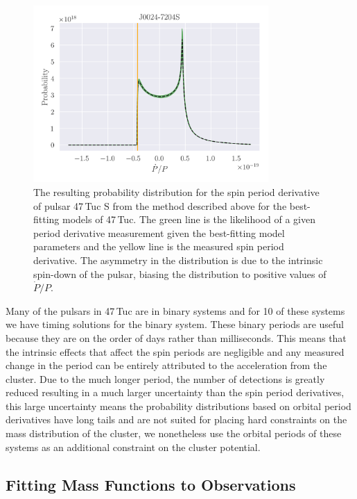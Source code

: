 \begin{figure}
    \centering
    \includegraphics[width=0.8\textwidth]{figures/pulsar-likelihood.png}
    \caption{The resulting probability distribution for the spin period derivative of pulsar 47\,Tuc
        S from the method described above for the best-fitting models of 47\,Tuc. The green line is
        the likelihood of a given period derivative measurement given the best-fitting model
        parameters and the yellow line is the measured spin period derivative. The asymmetry in the
        distribution is due to the intrinsic spin-down of the pulsar, biasing the distribution to
        positive values of $\dot{P}/P$.}
    \label{fig:pulsar-likelihood}
\end{figure}

Many of the pulsars in 47\,Tuc are in binary systems and for 10 of these systems we have timing
solutions for the binary system. These binary periods are useful because they are on the order of
days rather than milliseconds. This means that the intrinsic effects that affect the spin periods
are negligible and any measured change in the period can be entirely attributed to the acceleration
from the cluster. Due to the much longer period, the number of detections is greatly reduced
resulting in a much larger uncertainty than the spin period derivatives, this large uncertainty
means the probability distributions based on orbital period derivatives have long tails and are not
suited for placing hard constraints on the mass distribution of the cluster, we nonetheless use the
orbital periods of these systems as an additional constraint on the cluster potential.


\subsection{Fitting Mass Functions to Observations}


